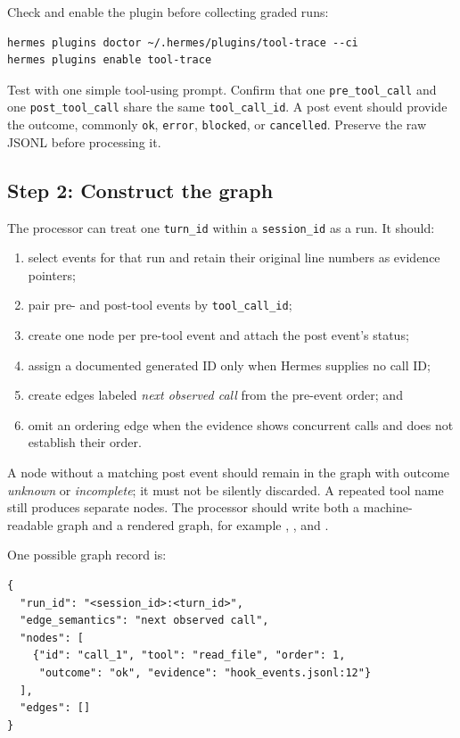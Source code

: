\documentclass[11pt]{article}
\begin{document}
Check and enable the plugin before collecting graded runs:
\begin{verbatim}
hermes plugins doctor ~/.hermes/plugins/tool-trace --ci
hermes plugins enable tool-trace
\end{verbatim}
Test with one simple tool-using prompt. Confirm that one \texttt{pre\_tool\_call} and one \texttt{post\_tool\_call} share the same \texttt{tool\_call\_id}. A post event should provide the outcome, commonly \texttt{ok}, \texttt{error}, \texttt{blocked}, or \texttt{cancelled}. Preserve the raw JSONL before processing it.

\subsection{Step 2: Construct the graph}
The processor can treat one \texttt{turn\_id} within a \texttt{session\_id} as a run. It should:
\begin{enumerate}
  \item select events for that run and retain their original line numbers as evidence pointers;
  \item pair pre- and post-tool events by \texttt{tool\_call\_id};
  \item create one node per pre-tool event and attach the post event's status;
  \item assign a documented generated ID only when Hermes supplies no call ID;
  \item create edges labeled \emph{next observed call} from the pre-event order; and
  \item omit an ordering edge when the evidence shows concurrent calls and does not establish their order.
\end{enumerate}
A node without a matching post event should remain in the graph with outcome \emph{unknown} or \emph{incomplete}; it must not be silently discarded. A repeated tool name still produces separate nodes. The processor should write both a machine-readable graph and a rendered graph, for example , , and .

One possible graph record is:
\begin{verbatim}
{
  "run_id": "<session_id>:<turn_id>",
  "edge_semantics": "next observed call",
  "nodes": [
    {"id": "call_1", "tool": "read_file", "order": 1,
     "outcome": "ok", "evidence": "hook_events.jsonl:12"}
  ],
  "edges": []
}
\end{verbatim}
\end{document}
